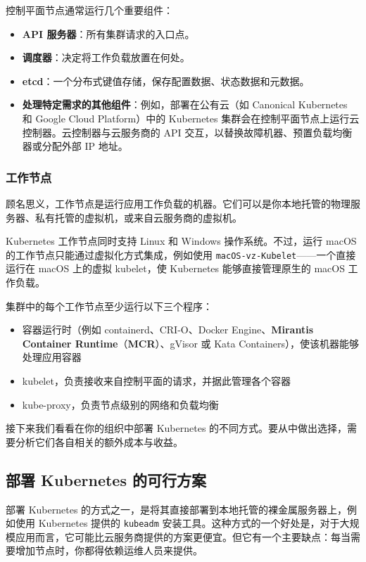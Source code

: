控制平面节点通常运行几个重要组件：

\begin{itemize}
\item \textbf{API 服务器}：所有集群请求的入口点。
\item \textbf{调度器}：决定将工作负载放置在何处。
\item \textbf{etcd}：一个分布式键值存储，保存配置数据、状态数据和元数据。
\item \textbf{处理特定需求的其他组件}：例如，部署在公有云（如 Canonical Kubernetes 和 Google Cloud Platform）中的 Kubernetes 集群会在控制平面节点上运行云控制器。云控制器与云服务商的 API 交互，以替换故障机器、预置负载均衡器或分配外部 IP 地址。
\end{itemize}

\subsubsection{工作节点}

\label{idx:1950}
\label{idx:1951}
顾名思义，工作节点是运行应用工作负载的机器。它们可以是你本地托管的物理服务器、私有托管的虚拟机，或来自云服务商的虚拟机。

Kubernetes 工作节点同时支持 Linux 和 Windows 操作系统。不过，运行 macOS 的工作节点只能通过虚拟化方式集成，例如使用 \texttt{mac\allowbreak{}OS-vz-Kubelet}——一个直接运行在 macOS 上的虚拟 kubelet，使 Kubernetes 能够直接管理原生的 macOS 工作负载。

集群中的每个工作节点至少运行以下三个程序：

\begin{itemize}
\label{idx:1952}
\item 容器运行时（例如 containerd、CRI-O、Docker Engine、\textbf{Mirantis Container Runtime}（\textbf{MCR}）、gVisor 或 Kata Containers），使该机器能够处理应用容器
\item kubelet，负责接收来自控制平面的请求，并据此管理各个容器
\item kube-proxy，负责节点级别的网络和负载均衡
\end{itemize}

\label{idx:1953}
接下来我们看看在你的组织中部署 Kubernetes 的不同方式。要从中做出选择，需要分析它们各自相关的额外成本与收益。

\subsection{部署 Kubernetes 的可行方案}

\label{idx:1954}
部署 Kubernetes 的方式之一，是将其直接部署到本地托管的裸金属服务器上，例如使用 Kubernetes 提供的 \texttt{kubeadm} 安装工具。这种方式的一个好处是，对于大规模应用而言，它可能比云服务商提供的方案更便宜。但它有一个主要缺点：每当需要增加节点时，你都得依赖运维人员来提供。

